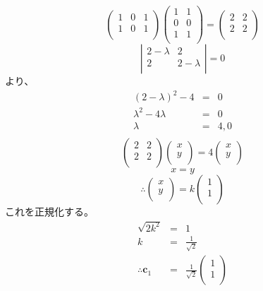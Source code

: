 \begin{enumerate}
\[
\left(
\begin{array}{rrr}
1 & 0 & 1\\
1 & 0 & 1\\
\end{array}
\right)
\left(
\begin{array}{rr}
1 & 1\\
0 & 0\\
1 & 1\\
\end{array}
\right)
= 
\left(
\begin{array}{rr}
2 & 2\\
2 & 2\\
\end{array}
\right)
\]
\[
\left|
\begin{array}{cc}
2 - \lambda & 2 \\
2           & 2 - \lambda \\
\end{array}
\right|
= 0
\]
より、
\begin{eqnarray*}
(2-\lambda)^2 - 4 & = & 0 \\
\lambda^2 - 4 \lambda & = & 0 \\
\lambda & = & 4, 0 \\
\end{eqnarray*}
\[
\left(
\begin{array}{cc}
2 & 2 \\
2 & 2 \\
\end{array}
\right)
\left(
\begin{array}{c}
x\\
y\\
\end{array}
\right)
= 4
\left(
\begin{array}{c}
x\\
y\\
\end{array}
\right)
\]
\[x = y\]
\[\therefore \left(
\begin{array}{c}
x\\
y\\
\end{array}
\right)
= k
\left(
\begin{array}{c}
1\\
1\\
\end{array}
\right)
\]
これを正規化する。
\begin{eqnarray*}
\sqrt{2k^2} & = & 1 \\
k & = & \frac{1}{\sqrt{2}}\\
\therefore {\mathbf c}_1 & = & \frac{1}{\sqrt{2}}\left(
\begin{array}{c}
1\\
1\\
\end{array}
\right)\\ 
\end{eqnarray*}


\end{enumerate}
